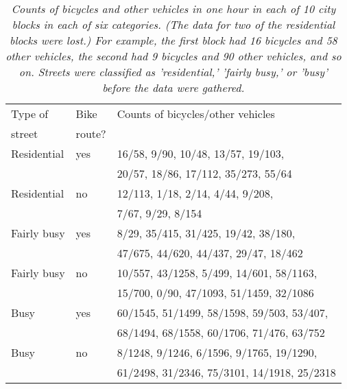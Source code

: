 \documentclass[12pt]{article}
\begin{document}
\begin{table}
	\centering 
	\begin{tabular}
		{lll} Type of & Bike & Counts of bicycles/other vehicles \\
		street & route? & \\
		\hline Residential & yes & 16/58, 9/90, 10/48, 13/57, 19/103, \\
		& & 20/57, 18/86, 17/112, 35/273, 55/64 \\
		Residential & no & 12/113, 1/18, 2/14, 4/44, 9/208, \\
		& & 7/67, 9/29, 8/154 \\
		Fairly busy & yes & 8/29, 35/415, 31/425, 19/42, 38/180, \\
		& & 47/675, 44/620, 44/437, 29/47, 18/462 \\
		Fairly busy & no & 10/557, 43/1258, 5/499, 14/601, 58/1163, \\
		& & 15/700, 0/90, 47/1093, 51/1459, 32/1086 \\
		Busy & yes & 60/1545, 51/1499, 58/1598, 59/503, 53/407, \\
		& & 68/1494, 68/1558, 60/1706, 71/476, 63/752 \\
		Busy & no & 8/1248, 9/1246, 6/1596, 9/1765, 19/1290, \\
		& & 61/2498, 31/2346, 75/3101, 14/1918, 25/2318 
	\end{tabular}
	\caption{{\em Counts of bicycles and other vehicles in one hour in each of 10 city blocks in each of six categories. (The data for two of the residential blocks were lost.) For example, the first block had 16 bicycles and 58 other vehicles, the second had 9 bicycles and 90 other vehicles, and so on. Streets were classified as 'residential,' 'fairly busy,' or 'busy' before the data were gathered.}} 
\end{table}
\end{document}
